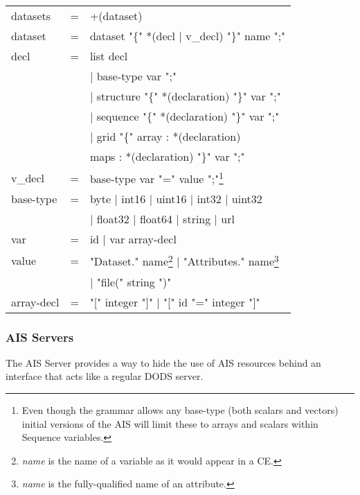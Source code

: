 \documentclass{article}
\begin{document}
\begin{minipage}{5in}
\begin{ttfamily}
\begin{center}
\begin{tabular}{lll}
datasets & = & +(dataset) \\
dataset  & = & dataset "\{" *(decl | v\_decl) "\}" name ";" \\
decl & = & list decl  \\
            & &   | base-type var ";" \\
            & &   | structure  "\{" *(declaration) "\}" var ";" \\
            & &   | sequence "\{" *(declaration) "\}" var ";" \\
            & &   | grid "\{" array : *(declaration) \\
            & &     maps : *(declaration) "\}" var ";" \\
v\_decl & = & base-type var "=" value ";"\footnote{Even though the grammar
  allows any base-type (both scalars and vectors) initial versions of the
  \ac{AIS} will limit these to arrays and scalars within Sequence variables.}
  \\
base-type & = & byte | int16 | uint16 | int32 | uint32 \\ 
          & &   | float32 | float64 | string | url \\
var     & = & id | var array-decl \\
value & = & "Dataset." name\footnote{\emph{name} is the name of a
  variable as it would appear in a \ac{CE}.}
          | "Attributes." name\footnote{\emph{name} is the fully-qualified
  name of an attribute.}\\ 
      & & | "file(" string ")"\\
array-decl & = & "[" integer "]" | "[" id "=" integer "]" \\
\end{tabular}
\end{center}
\end{ttfamily}
\end{minipage}
\cbend

\subsubsection{\ac{AIS} Servers}
\label{sec:ais-servers}

The \ac{AIS} Server provides a way to hide the use of \ac{AIS} resources
behind an interface that acts like a regular DODS server. 
\end{document}
